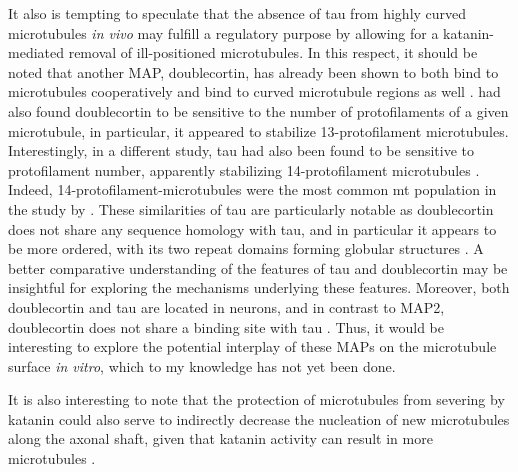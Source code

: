 It also is tempting to speculate that the absence of tau from highly curved microtubules \textit{in vivo} may fulfill a regulatory purpose by allowing for a katanin-mediated removal of ill-positioned microtubules. In this respect, it should be noted that another MAP, doublecortin, has already been shown to both bind to microtubules cooperatively and bind to curved microtubule regions as well \parencite{Bechstedt2012, Bechstedt2014}. \cite{Bechstedt2012} had also found doublecortin to be sensitive to the number of protofilaments of a given microtubule, in particular, it appeared to stabilize 13-protofilament microtubules. Interestingly, in a different study, tau had also been found to be sensitive to protofilament number, apparently stabilizing 14-protofilament microtubules . Indeed, 14-protofilament-microtubules were the most common mt population in the study by \cite{Kellogg2018}. These similarities of tau are particularly notable as doublecortin does not share any sequence homology with tau, and in particular it appears to be more ordered, with its two repeat domains forming globular structures . A better comparative understanding of the features of tau and doublecortin may be insightful for exploring the mechanisms underlying these features. Moreover, both doublecortin and tau are located in neurons, and in contrast to MAP2, doublecortin does not share a binding site with tau . Thus, it would be interesting to explore the potential interplay of these MAPs on the microtubule surface \textit{in vitro}, which to my knowledge has not yet been done. \par

It is also interesting to note that the protection of microtubules from severing by katanin could also serve to indirectly decrease the nucleation of new microtubules along the axonal shaft, given that katanin activity can result in more microtubules .\par

